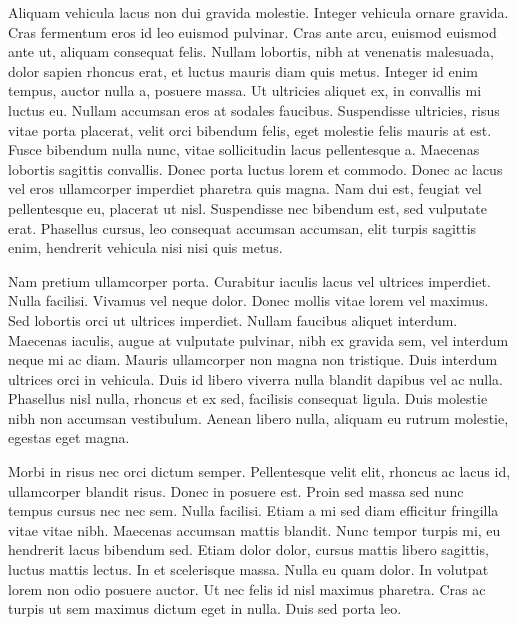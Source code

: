 \documentclass{letter-friggeri}
\begin{document}
Aliquam vehicula lacus non dui gravida molestie. Integer vehicula ornare gravida. Cras fermentum eros id leo euismod pulvinar. Cras ante arcu, euismod euismod ante ut, aliquam consequat felis. Nullam lobortis, nibh at venenatis malesuada, dolor sapien rhoncus erat, et luctus mauris diam quis metus. Integer id enim tempus, auctor nulla a, posuere massa. Ut ultricies aliquet ex, in convallis mi luctus eu. Nullam accumsan eros at sodales faucibus. Suspendisse ultricies, risus vitae porta placerat, velit orci bibendum felis, eget molestie felis mauris at est. Fusce bibendum nulla nunc, vitae sollicitudin lacus pellentesque a. Maecenas lobortis sagittis convallis. Donec porta luctus lorem et commodo. Donec ac lacus vel eros ullamcorper imperdiet pharetra quis magna. Nam dui est, feugiat vel pellentesque eu, placerat ut nisl. Suspendisse nec bibendum est, sed vulputate erat. Phasellus cursus, leo consequat accumsan accumsan, elit turpis sagittis enim, hendrerit vehicula nisi nisi quis metus.

Nam pretium ullamcorper porta. Curabitur iaculis lacus vel ultrices imperdiet. Nulla facilisi. Vivamus vel neque dolor. Donec mollis vitae lorem vel maximus. Sed lobortis orci ut ultrices imperdiet. Nullam faucibus aliquet interdum. Maecenas iaculis, augue at vulputate pulvinar, nibh ex gravida sem, vel interdum neque mi ac diam. Mauris ullamcorper non magna non tristique. Duis interdum ultrices orci in vehicula. Duis id libero viverra nulla blandit dapibus vel ac nulla. Phasellus nisl nulla, rhoncus et ex sed, facilisis consequat ligula. Duis molestie nibh non accumsan vestibulum. Aenean libero nulla, aliquam eu rutrum molestie, egestas eget magna. 

Morbi in risus nec orci dictum semper. Pellentesque velit elit, rhoncus ac lacus id, ullamcorper blandit risus. Donec in posuere est. Proin sed massa sed nunc tempus cursus nec nec sem. Nulla facilisi. Etiam a mi sed diam efficitur fringilla vitae vitae nibh. Maecenas accumsan mattis blandit. Nunc tempor turpis mi, eu hendrerit lacus bibendum sed. Etiam dolor dolor, cursus mattis libero sagittis, luctus mattis lectus. In et scelerisque massa. Nulla eu quam dolor. In volutpat lorem non odio posuere auctor. Ut nec felis id nisl maximus pharetra. Cras ac turpis ut sem maximus dictum eget in nulla. Duis sed porta leo.


\cloture
\end{document}
